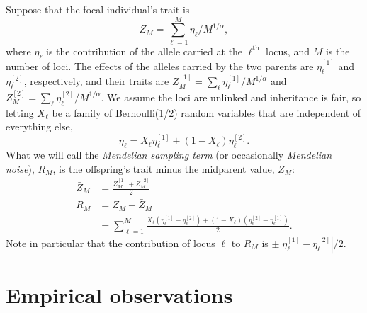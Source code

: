 \documentclass{article}
\newcommand{\1}{\mathbbm{1}}
\theoremstyle{remark}
\theoremstyle{definition}
\begin{document}
Suppose that the focal individual's trait is
$$
    Z_M = \sum_{\ell=1}^M \eta_\ell / M^{1/\alpha},
$$
where $\eta_\ell$ is the contribution of the allele carried at the $\ell^\text{th}$ locus,
and $M$ is the number of loci. 
The effects of the alleles carried by the two parents
are $\eta_\ell^{[1]}$ and $\eta_\ell^{[2]}$, respectively,
and their traits are
$Z_M^{[1]} = \sum_\ell \eta_\ell^{[1]} / M^{1/\alpha}$ and
$Z_M^{[2]} = \sum_\ell \eta_\ell^{[2]} / M^{1/\alpha}$.
We assume the loci are unlinked and inheritance is fair, so
letting $X_\ell$ be a family of Bernoulli(1/2) random variables that are independent of everything else,
$$
    \eta_\ell = X_\ell \eta_\ell^{[1]} + (1 - X_\ell) \eta_\ell^{[2]} .
$$
What we will call the \emph{Mendelian sampling term}
(or occasionally \emph{Mendelian noise}), $R_M$,
is the offspring's trait minus the midparent value, $\bar Z_M$:
\begin{align*}
    \bar Z_M &= \frac{Z_M^{[1]} + Z_M^{[2]}}{2} \\
    R_M &= Z_M - \bar Z_M \\
        &= \sum_{\ell=1}^M
            \frac{
                X_\ell (\eta_\ell^{[1]} - \eta_\ell^{[2]})
                + (1 - X_\ell) (\eta_\ell^{[2]} - \eta_\ell^{[1]})
            }{ 2 } .
\end{align*}
Note in particular that
the contribution of locus $\ell$ to $R_M$ is $\pm |\eta_\ell^{[1]} - \eta_\ell^{[2]}|/2$.


\section{Empirical observations}
    \label{sec:empirical}
\end{document}
